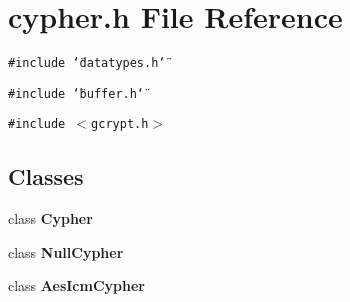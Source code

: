 \section{cypher.h File Reference}
\label{cypher_8h}
{\tt \#include \char`\"{}datatypes.h\char`\"{}}\par
{\tt \#include \char`\"{}buffer.h\char`\"{}}\par
{\tt \#include $<$gcrypt.h$>$}\par
\subsection*{Classes}
\begin{CompactItemize}
\item 
class {\bf Cypher}
\item 
class {\bf Null\-Cypher}
\item 
class {\bf Aes\-Icm\-Cypher}
\end{CompactItemize}
